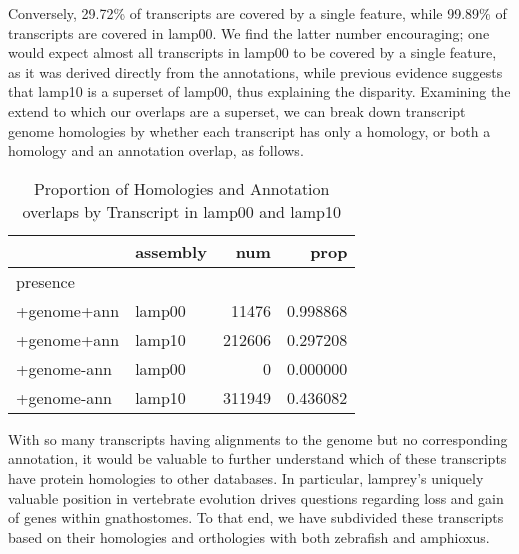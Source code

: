 \documentclass{article}
\begin{document}
Conversely, 29.72\%
 of transcripts are covered by a single feature, while 99.89\%
 of 
transcripts are covered in lamp00. We find the latter number encouraging; one would expect almost all transcripts in lamp00 to be covered by a single feature, as it was derived directly from the annotations,
while previous evidence suggests that lamp10 is a superset of lamp00, thus explaining the disparity. Examining the extend to which our overlaps are a superset, we can break down transcript genome homologies by
whether each transcript has only a homology, or both a homology and an annotation overlap, as follows.

\begin{table}[H]
\caption {Proportion of Homologies and Annotation overlaps by Transcript in lamp00 and lamp10}
\begin{center}

\begin{tabular}{llrr}
\toprule
{} & assembly &     num &      prop \\
\midrule
presence    &          &         &           \\
+genome+ann &   lamp00 &   11476 &  0.998868 \\
+genome+ann &   lamp10 &  212606 &  0.297208 \\
+genome-ann &   lamp00 &       0 &  0.000000 \\
+genome-ann &   lamp10 &  311949 &  0.436082 \\
\bottomrule
\end{tabular}



\end{center}
\end{table}

With so many transcripts having alignments to the genome but no corresponding annotation, it would be valuable to further understand which of these transcripts have protein
homologies to other databases. In particular, lamprey's uniquely valuable position in vertebrate evolution drives questions regarding loss and gain of genes within	gnathostomes.
To that end, we have subdivided these transcripts based on their homologies and orthologies with both zebrafish and amphioxus.

\end{document}
